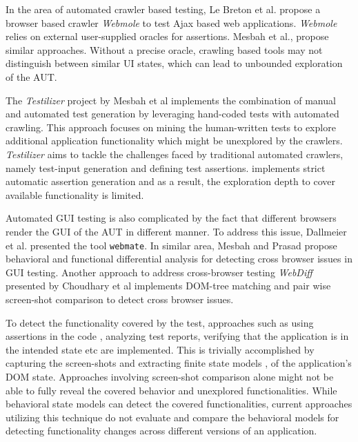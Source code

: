 In the area of automated crawler based testing, Le Breton et al. \cite{le2013automated} propose a browser based crawler \textit{Webmole} to test Ajax based web applications. \textit{Webmole} relies on external user-supplied oracles for assertions. Mesbah et al.\cite{Crawljax},\cite{MesbahInvarient} propose similar approaches. Without a precise oracle, crawling based tools may not distinguish between similar UI states, which can lead to unbounded exploration of the AUT.

The \textit{Testilizer} project by Mesbah et al \cite{testilizer} implements the combination of manual and automated test generation by leveraging hand-coded tests with automated crawling. This approach focuses on mining the human-written tests to explore additional application functionality which might be unexplored by the crawlers. \textit{Testilizer} aims to tackle the challenges faced by traditional automated crawlers, namely test-input generation and defining test assertions. implements strict automatic assertion generation and as a result, the exploration depth to cover available functionality is limited.

Automated GUI testing is also complicated by the fact that different browsers render the GUI of the AUT in different manner. To address this issue, Dallmeier et al. presented the tool \texttt{webmate}. In similar area, Mesbah and Prasad\cite{CBCMesbah} propose behavioral and functional differential analysis for detecting cross browser issues in GUI testing. Another approach to address cross-browser testing \textit{WebDiff} presented by Choudhary et al \cite{WebDiff} implements DOM-tree matching and pair wise screen-shot comparison to detect cross browser issues. 

To detect the functionality covered by the test, approaches such as using assertions in the code \cite{voas1997assertions}, analyzing test reports, verifying that the application is in the intended state etc are implemented. This is trivially accomplished by capturing the screen-shots \cite{GUIdiffBauersfeld} and extracting finite state models \cite{marchettoStateBased}, \cite{SchurMiningBehavModels} of the application's DOM state. Approaches involving screen-shot comparison alone might not be able to fully reveal the covered behavior and unexplored functionalities. While behavioral state models can detect the covered functionalities, current approaches utilizing this technique do not evaluate and compare the behavioral models for detecting functionality changes across different versions of an application. 

